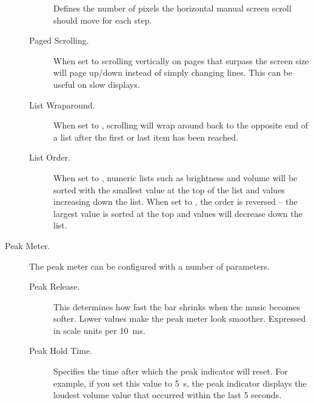 \begin{description}
\begin{description}
      Defines the number of pixels the horizontal manual screen scroll should move
      for each step.
    \item[Paged Scrolling.]
      When set to  scrolling vertically on pages that surpass the
      screen size will page up/down instead of simply changing lines. This can be
      useful on slow displays.
    \item[List Wraparound.]
      When set to , scrolling will wrap around back to the opposite
      end of a list after the first or last item has been reached.
    \item[List Order.]
      When set to , numeric lists such as brightness and
      volume will be sorted with the smallest value at the top of the list and
      values increasing down the list. When set to , the
      order is reversed -- the largest value is sorted at the top and values
      will decrease down the list.
    \end{description}
%
  \item[Peak Meter.]
    The peak meter can be configured with a number of parameters.
    \begin{description}
    \item[Peak Release.]
      This determines how fast the bar shrinks when the music becomes
      softer. Lower values make the peak meter look smoother.
      Expressed in scale units per 10~ms.
    \item[Peak Hold Time.]
      Specifies the time after which the peak indicator will reset.
      For example, if you set this value to 5~s, the peak indicator displays
      the loudest volume value that occurred within the last 5 seconds.

\end{description}
\end{description}
